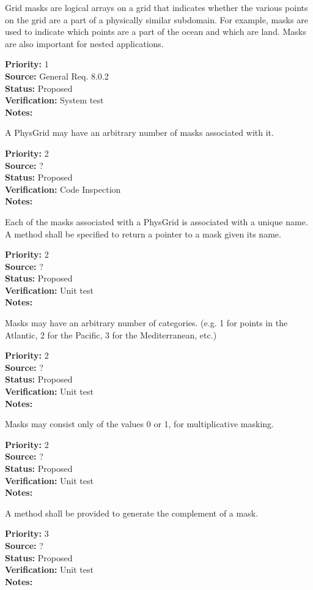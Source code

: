 Grid masks are logical arrays on a grid that indicates whether the various
points on the grid are a part of a physically similar subdomain. For example,
masks are used to indicate which points are a part of the ocean and which are
land.  Masks are also important for nested applications.

\begin{reqlist}
{\bf Priority:} 1 \\
{\bf Source:} General Req. 8.0.2 \\
{\bf Status:} Proposed \\
{\bf Verification:} System test\\
{\bf Notes:} 
\end{reqlist}

A PhysGrid may have an arbitrary number of masks associated with it.
\begin{reqlist}
{\bf Priority:} 2 \\
{\bf Source:} ? \\
{\bf Status:} Proposed \\
{\bf Verification:} Code Inspection\\
{\bf Notes:} 
\end{reqlist}

Each of the masks associated with a PhysGrid is associated with a
unique name.  A method shall be specified to return a pointer to a mask given
its name.
\begin{reqlist}
{\bf Priority:} 2 \\
{\bf Source:} ? \\
{\bf Status:} Proposed \\
{\bf Verification:} Unit test\\
{\bf Notes:} 
\end{reqlist}

Masks may have an arbitrary number of categories. (e.g. 1 for points in the
Atlantic, 2 for the Pacific, 3 for the Mediterranean, etc.)
\begin{reqlist}
{\bf Priority:} 2 \\
{\bf Source:} ? \\
{\bf Status:} Proposed \\
{\bf Verification:} Unit test\\
{\bf Notes:} 
\end{reqlist}

Masks may consist only of the values 0 or 1, for multiplicative masking.
\begin{reqlist}
{\bf Priority:} 2 \\
{\bf Source:} ? \\
{\bf Status:} Proposed \\
{\bf Verification:} Unit test\\
{\bf Notes:} 
\end{reqlist}

A method shall be provided to generate the complement of a mask.
\begin{reqlist}
{\bf Priority:} 3 \\
{\bf Source:} ? \\
{\bf Status:} Proposed \\
{\bf Verification:} Unit test\\
{\bf Notes:} 
\end{reqlist}
